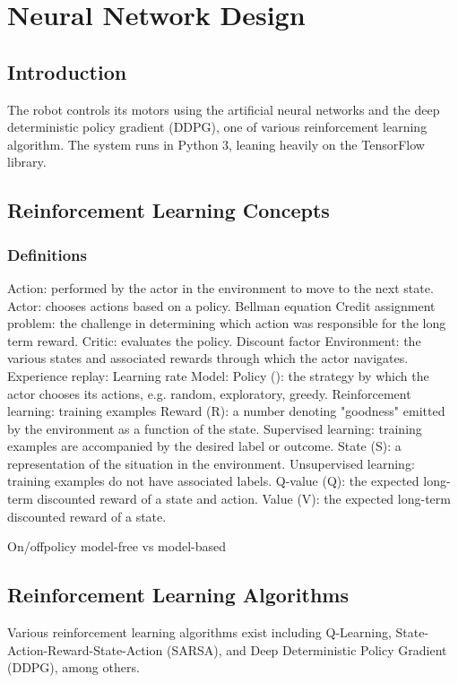 \chapter{Neural Network Design}
\section{Introduction}
The robot controls its motors using the artificial neural networks and the deep deterministic policy gradient (DDPG), one of various reinforcement learning algorithm. The system runs in Python 3, leaning heavily on the TensorFlow library.

\section{Reinforcement Learning Concepts}

\subsection{Definitions \cite{huang_2018}\cite{emami_2016}\cite{matiisen_2015}\cite{bibid}}
Action: performed by the actor in the environment to move to the next state.
Actor: chooses actions based on a policy.
Bellman equation
Credit assignment problem: the challenge in determining which action was responsible for the long term reward.
Critic: evaluates the policy.
Discount factor
Environment: the various states and associated rewards through which the actor navigates.
Experience replay:
Learning rate
Model: 
Policy (\pi): the strategy by which the actor chooses its actions, e.g. random, exploratory, greedy.
Reinforcement learning: training examples 
Reward (R): a number denoting "goodness" emitted by the environment as a function of the state.
Supervised learning: training examples are accompanied by the desired label or outcome.
State (S): a representation of the situation in the environment.
Unsupervised learning: training examples do not have associated labels. 
Q-value (Q): the expected long-term discounted reward of a state and action.
Value (V): the expected long-term discounted reward of a state.


On/offpolicy
model-free vs model-based


\section{Reinforcement Learning Algorithms}
Various reinforcement learning algorithms exist including Q-Learning, State-Action-Reward-State-Action (SARSA), and Deep Deterministic Policy Gradient (DDPG), among others.

